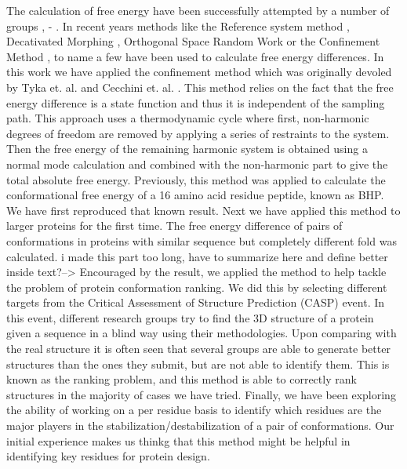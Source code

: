 \documentclass[12pt]{article}
\newcommand{\Alberto}[1]{\color{ForestGreen}#1\normalcolor }
\begin{document}
The calculation of free energy have been successfully attempted by a number of groups \cite{Meirovitch2007}, 
\cite{Ytreberg2006} - \cite{Zheng2008}. In recent years methods like the Reference system method \cite{Ytreberg2006}, 
Decativated Morphing \cite{Park2008}, Orthogonal Space Random Work \cite{Zheng2008} or the Confinement 
Method \cite{Tyka2006}, \cite{Cecchini2009} to name a few have been used to calculate free energy
differences.
In this work we have applied the confinement method which was originally devoled by Tyka et. al. \cite{Tyka2006} and
Cecchini et. al. \cite{Cecchini2009}. This method relies on the fact that the free energy difference is a state function and 
thus it is independent of the sampling path. This approach uses a thermodynamic cycle where first, non-harmonic degrees of
freedom are removed by applying a series of restraints to the system. Then the free energy of the
remaining harmonic system is obtained using a normal mode calculation and combined with the
non-harmonic part to give the total absolute free energy.  Previously, this method was applied to
calculate the conformational free energy of a 16 amino acid residue peptide, known as BHP.  We have
first reproduced that known result. Next we have applied this method to larger proteins for the
first time. The free energy difference of pairs of conformations in proteins with similar sequence but completely
different fold was calculated. \Alberto{i made this part too long, have to summarize here and define
better inside text?-->} Encouraged by the result, we applied the method to help tackle the
problem of protein conformation ranking. We did this by selecting different targets from the
Critical Assessment of Structure Prediction (CASP) event. In this event, different research groups
try to find the 3D structure of a protein given a sequence in a blind way using their methodologies. Upon comparing
with the real structure it is often seen that several groups are able to generate better structures
than the ones they submit, but are not able to identify them. This is known as the ranking problem,
and this method is able to correctly rank structures in the majority of cases we have tried.
 Finally, we have been exploring the ability of working on a per residue basis to identify which
 residues are the major players in the stabilization/destabilization of a pair of conformations. Our
 initial experience makes us thinkg that this method might be helpful in identifying key residues
 for protein design.

\end{document}
